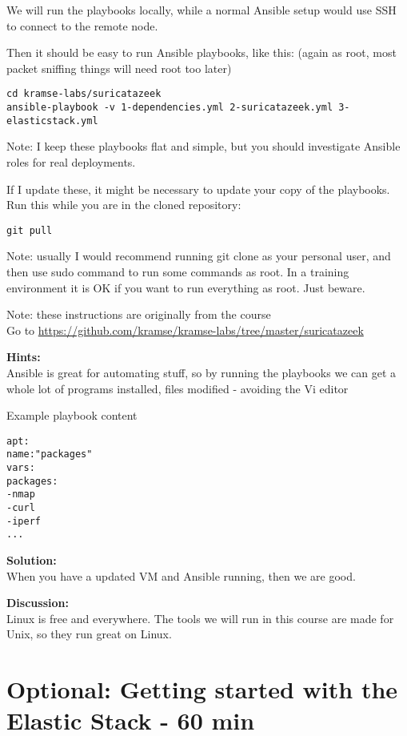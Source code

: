 \documentclass[a4paper,11pt,notitlepage]{report}
\begin{document}
We will run the playbooks locally, while a normal Ansible setup would use SSH to connect to the remote node.

Then it should be easy to run Ansible playbooks, like this: (again as root, most packet sniffing things will need root too later)

\begin{verbatim}
cd kramse-labs/suricatazeek
ansible-playbook -v 1-dependencies.yml 2-suricatazeek.yml 3-elasticstack.yml
\end{verbatim}

Note: I keep these playbooks flat and simple, but you should investigate Ansible roles for real deployments.

If I update these, it might be necessary to update your copy of the playbooks. Run this while you are in the cloned repository:

\begin{verbatim}
git pull
\end{verbatim}

Note: usually I would recommend running git clone as your personal user, and then use sudo command to run some commands as root. In a training environment it is OK if you want to run everything as root. Just beware.

Note: these instructions are originally from the course\\
Go to \url{https://github.com/kramse/kramse-labs/tree/master/suricatazeek}

{\bf Hints:}\\
Ansible is great for automating stuff, so by running the playbooks we can get a whole lot of programs installed, files modified - avoiding the Vi editor \smiley

Example playbook content
\begin{alltt}
apt:
      name: "{{ packages }}"
    vars:
      packages:
        - nmap
        - curl
        - iperf
        ...
\end{alltt}

{\bf Solution:}\\
When you have a updated VM and Ansible running, then we are good.

{\bf Discussion:}\\
Linux is free and everywhere. The tools we will run in this course are made for Unix, so they run great on Linux.



\chapter{Optional: Getting started with the Elastic Stack - 60 min}
\label{ex:dateformats}
\end{document}

